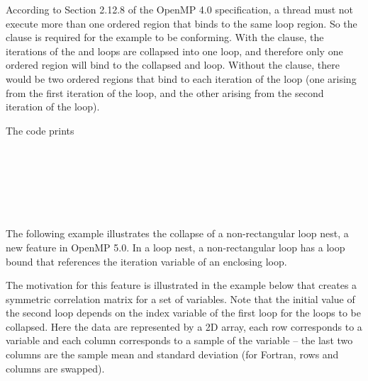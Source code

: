 According to Section 2.12.8 of the OpenMP 4.0 specification, 
a thread must not execute more than one ordered region that binds 
to the same loop region. So the  clause is required for the example 
to be conforming. With the  clause, the iterations of the  
and  loops are collapsed into one loop, and therefore only one ordered 
region will bind to the collapsed  and  loop. Without the  
clause, there would be two ordered regions that bind to each iteration of the  
loop (one arising from the first iteration of the  loop, and the other 
arising from the second iteration of the  loop).

The code prints

\\
\\
\\
\\
\\


\clearpage


The following example illustrates the collapse of a non-rectangular loop nest,
a new feature in OpenMP 5.0. In a loop nest, a non-rectangular loop has a
loop bound that references the iteration variable of an enclosing loop.

The motivation for this feature is illustrated
in the example below that creates a symmetric correlation matrix for a set of
variables. Note that the initial value of the second loop depends on the index
variable of the first loop for the loops to be collapsed.
Here the data are represented by a 2D array, each row corresponds to a variable
and each column corresponds to a sample of the variable -- the last two columns
are the sample mean and standard deviation (for Fortran, rows and columns are swapped).


